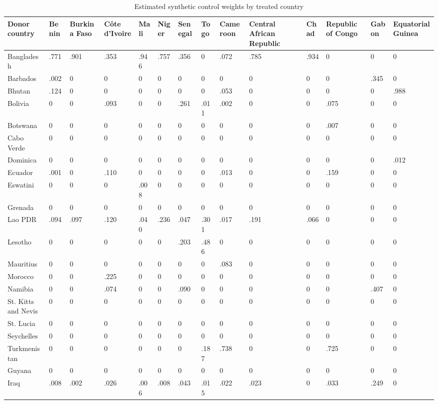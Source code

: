 \begin{table}

\caption{Estimated synthetic control weights by treated country}
\centering
\begin{tabular}[t]{llllllllllllll}
\toprule
Donor country & Benin & Burkina Faso & Côte d'Ivoire & Mali & Niger & Senegal & Togo & Cameroon & Central African Republic & Chad & Republic of Congo & Gabon & Equatorial Guinea\\
\midrule
Bangladesh & .771 & .901 & .353 & .946 & .757 & .356 & 0 & .072 & .785 & .934 & 0 & 0 & 0\\
Barbados & .002 & 0 & 0 & 0 & 0 & 0 & 0 & 0 & 0 & 0 & 0 & .345 & 0\\
Bhutan & .124 & 0 & 0 & 0 & 0 & 0 & 0 & .053 & 0 & 0 & 0 & 0 & .988\\
Bolivia & 0 & 0 & .093 & 0 & 0 & .261 & .011 & .002 & 0 & 0 & .075 & 0 & 0\\
Botswana & 0 & 0 & 0 & 0 & 0 & 0 & 0 & 0 & 0 & 0 & .007 & 0 & 0\\
\addlinespace
Cabo Verde & 0 & 0 & 0 & 0 & 0 & 0 & 0 & 0 & 0 & 0 & 0 & 0 & 0\\
Dominica & 0 & 0 & 0 & 0 & 0 & 0 & 0 & 0 & 0 & 0 & 0 & 0 & .012\\
Ecuador & .001 & 0 & .110 & 0 & 0 & 0 & 0 & .013 & 0 & 0 & .159 & 0 & 0\\
Eswatini & 0 & 0 & 0 & .008 & 0 & 0 & 0 & 0 & 0 & 0 & 0 & 0 & 0\\
Grenada & 0 & 0 & 0 & 0 & 0 & 0 & 0 & 0 & 0 & 0 & 0 & 0 & 0\\
\addlinespace
Lao PDR & .094 & .097 & .120 & .040 & .236 & .047 & .301 & .017 & .191 & .066 & 0 & 0 & 0\\
Lesotho & 0 & 0 & 0 & 0 & 0 & .203 & .486 & 0 & 0 & 0 & 0 & 0 & 0\\
Mauritius & 0 & 0 & 0 & 0 & 0 & 0 & 0 & .083 & 0 & 0 & 0 & 0 & 0\\
Morocco & 0 & 0 & .225 & 0 & 0 & 0 & 0 & 0 & 0 & 0 & 0 & 0 & 0\\
Namibia & 0 & 0 & .074 & 0 & 0 & .090 & 0 & 0 & 0 & 0 & 0 & .407 & 0\\
\addlinespace
St. Kitts and Nevis & 0 & 0 & 0 & 0 & 0 & 0 & 0 & 0 & 0 & 0 & 0 & 0 & 0\\
St. Lucia & 0 & 0 & 0 & 0 & 0 & 0 & 0 & 0 & 0 & 0 & 0 & 0 & 0\\
Seychelles & 0 & 0 & 0 & 0 & 0 & 0 & 0 & 0 & 0 & 0 & 0 & 0 & 0\\
Turkmenistan & 0 & 0 & 0 & 0 & 0 & 0 & .187 & .738 & 0 & 0 & .725 & 0 & 0\\
Guyana & 0 & 0 & 0 & 0 & 0 & 0 & 0 & 0 & 0 & 0 & 0 & 0 & 0\\
\addlinespace
Iraq & .008 & .002 & .026 & .006 & .008 & .043 & .015 & .022 & .023 & 0 & .033 & .249 & 0\\
\bottomrule
\end{tabular}
\end{table}